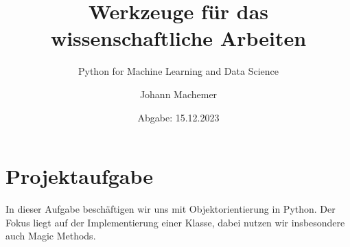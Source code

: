 \documentclass[
    oneside, %
    12pt, %
    a4paper, %
    parskip=full %
]{scrartcl}
\title{Werkzeuge für das wissenschaftliche Arbeiten}
\author{Johann Machemer}
\subtitle{Python for Machine Learning and Data Science}
\date{Abgabe: 15.12.2023}
\begin{document}
\maketitle


\tableofcontents



\section{Projektaufgabe}

In dieser Aufgabe beschäftigen wir uns mit Objektorientierung in Python.
Der Fokus liegt auf der Implementierung einer Klasse, dabei nutzen wir insbesondere auch Magic Methods.

\end{document}
